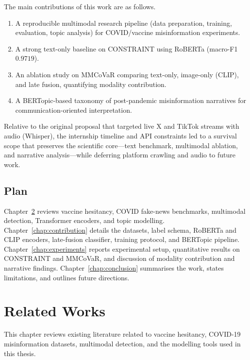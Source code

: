 \documentclass[12pt, a4paper]{report}
\begin{document}
The main contributions of this work are as follows.

\begin{enumerate}
  \item A reproducible multimodal research pipeline (data preparation, training, evaluation, topic analysis) for COVID/vaccine misinformation experiments.
  \item A strong text-only baseline on CONSTRAINT using RoBERTa (macro-F1~$0.9719$).
  \item An ablation study on MMCoVaR comparing text-only, image-only (CLIP), and late fusion, quantifying modality contribution.
  \item A BERTopic-based taxonomy of post-pandemic misinformation narratives for communication-oriented interpretation.
\end{enumerate}

Relative to the original proposal that targeted live X and TikTok streams with audio (Whisper), the internship timeline and API constraints led to a survival scope that preserves the scientific core---text benchmark, multimodal ablation, and narrative analysis---while deferring platform crawling and audio to future work.

\section{Plan}
\label{sec:plan}

Chapter~\ref{chap:related-works} reviews vaccine hesitancy, COVID fake-news benchmarks, multimodal detection, Transformer encoders, and topic modelling.
Chapter~\ref{chap:contribution} details the datasets, label schema, RoBERTa and CLIP encoders, late-fusion classifier, training protocol, and BERTopic pipeline.
Chapter~\ref{chap:experiments} reports experimental setup, quantitative results on CONSTRAINT and MMCoVaR, and discussion of modality contribution and narrative findings.
Chapter~\ref{chap:conclusion} summarises the work, states limitations, and outlines future directions.


\chapter{Related Works}
\label{chap:related-works}

This chapter reviews existing literature related to vaccine hesitancy, COVID-19 misinformation datasets, multimodal detection, and the modelling tools used in this thesis.
\end{document}
